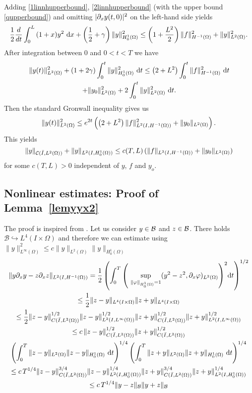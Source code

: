   Adding \eqref{1linnhupperbound}, \eqref{2linnhupperbound} (with the upper bound \eqref{qupperbound}) and omitting $\lvert\partial_{x} y(t,0)\rvert^{2}$ on the left-hand side yields
  \[
  \frac{1}{2}\frac{d}{dt}\int_{0}^{L}{(1+x)y^{2}~\mathrm dx} +\left(\frac{1}{2}+\gamma\right)\|y\|_{H^1_0(\Omega)}^2\leq \left(1 +\frac{L^{2}}{2}\right)\lVert f\rVert_{H^{-1}(\Omega)}^{2} + \|y\|_{L^2(\Omega)}^2.
  \]
  After integration between $0$ and $0<t<T$ we have
  \begin{multline*}
  \|y(t)\|_{L^2(\Omega)}^2+ \left( 1+2\gamma \right)\int_{0}^{t}{\|y\|_{H^1_0(\Omega)}^2~\mathrm dt}\leq \left(2+L^{2}\right)\int_{0}^{t}{\lVert f\rVert_{H^{-1}(\Omega)}^{2}~\mathrm dt}\\
  +\|y_{0}\|_{L^2(\Omega)}^2+2\int_0^t{\|y\|_{L^2(\Omega)}^2~\mathrm dt}.
  \end{multline*}
  Then the standard Gronwall inequality gives us
  \[
  \|y(t)\|_{L^2(\Omega)}^2  \leq e^{2t}\left(\left(2+L^{2}\right)\lVert f\rVert_{L^{2}(I,H^{-1}(\Omega))}^{2}+\lVert y_{0}\rVert_{L^{2}(\Omega)}\right).
  \]
  This yields
  \[
  \|y\|_{\mathcal C(\bar I,L^2(\Omega))}+\|y\|_{L^2(I,H^1_0(\Omega))}\leq c(T,L)\,(\|f\|_{\Hm1}+\|y_0\|_{L^2(\Omega)})
  \]
  for some $c(T,L)>0$ independent of $y$, $f$ and $y_o$.
\subsection{Nonlinear estimates: Proof of Lemma~\ref{lemyyx2}}
\label{sec:nonl-state-equat}
The proof is inspired from \cite[Theorem 2.8]{faminskii2010initial}. Let us consider $y \in \mathcal{B}$ and $z \in \mathcal{B}$. There holds $\mathcal B\hookrightarrow L^4(I\times \Omega)$ and therefore we can estimate using $\|y\|_{L^\infty(\Omega)}^2\leq c\|y\|_{L^2(\Omega)}\|y\|_{H^1_0(\Omega)}$
\begin{multline*}
\norm{y\partial_x y - z\partial_x z}_{\Hm1}= \frac 1 2\left(\int_0^T{\left(\ \sup_{\norm{\varphi}_{H^1_0(\Omega)} = 1}(y^2 -  z^2,\partial_x\varphi)_{L^2(\Omega)}\right)^2}\mathrm dt\right)^{1/2} \\
\leq \frac{1}{2}\norm{z-y}_{L^4(I\times \Omega)}\norm{z+y}_{L^4(I\times \Omega)}\\
\leq\frac{1}{2} \norm{z-y}_{C(\bar I,L^2(\Omega))}^{1/2}\norm{z-y}_{L^2(I,L^{\infty}(\Omega))}^{1/2}\norm{z+y}_{C(\bar I,L^2(\Omega))}^{1/2}\norm{z+y}_{L^2(I,L^{\infty}(\Omega))}^{1/2}\\
\leq c\, \norm{z-y}_{C(\bar I,L^2(\Omega))}^{1/2}\norm{z+y}_{C(\bar I,L^2(\Omega))}^{1/2}\\
\left(\int_0^T{ \norm{z-y}_{L^2(\Omega)}\norm{z-y}_{H^1_0(\Omega)}~\mathrm dt}\right)^{1/4}\left(\int_0^T{ \norm{z+y}_{L^2(\Omega)}\norm{z+y}_{H^1_0(\Omega)}~\mathrm dt}\right)^{1/4}\\
\leq c \,T^{1/4}\norm{z-y}_{C(\bar I,L^2(\Omega))}^{3/4}\norm{z-y}_{L^2(I,H^1_0(\Omega))}^{1/4}\norm{z+y}_{C(\bar I,L^2(\Omega))}^{3/4}\norm{z+y}_{L^2(I,H^1_0(\Omega))}^{1/4} \\
\leq c \,T^{1/4}\norm{y-z}_{\B}\norm{y+z}_{\B}
\end{multline*}
